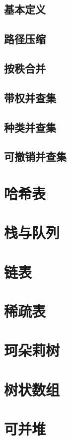 \documentclass[12pt,a4paper]{article}
\begin{document}
\subsection{基本定义}
\subsection{路径压缩}
\subsection{按秩合并}
\subsection{带权并查集}
\subsection{种类并查集}
\subsection{可撤销并查集}

\newpage
\section{哈希表}

\newpage
\section{栈与队列}

\newpage
\section{链表} %

\newpage
\section{稀疏表}

\newpage
\section{珂朵莉树}

\newpage
\section{树状数组}

\newpage
\section{可并堆}
\end{document}
